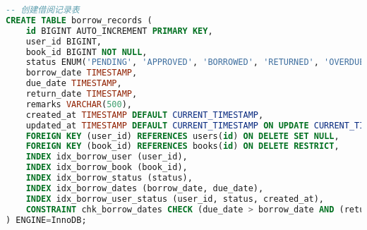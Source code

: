 \documentclass[12pt,a4paper]{article}
\begin{document}
\begin{lstlisting}[language=sql]
-- 创建借阅记录表
CREATE TABLE borrow_records (
    id BIGINT AUTO_INCREMENT PRIMARY KEY,
    user_id BIGINT,
    book_id BIGINT NOT NULL,
    status ENUM('PENDING', 'APPROVED', 'BORROWED', 'RETURNED', 'OVERDUE', 'REJECTED') NOT NULL,
    borrow_date TIMESTAMP,
    due_date TIMESTAMP,
    return_date TIMESTAMP,
    remarks VARCHAR(500),
    created_at TIMESTAMP DEFAULT CURRENT_TIMESTAMP,
    updated_at TIMESTAMP DEFAULT CURRENT_TIMESTAMP ON UPDATE CURRENT_TIMESTAMP,
    FOREIGN KEY (user_id) REFERENCES users(id) ON DELETE SET NULL,
    FOREIGN KEY (book_id) REFERENCES books(id) ON DELETE RESTRICT,
    INDEX idx_borrow_user (user_id),
    INDEX idx_borrow_book (book_id),
    INDEX idx_borrow_status (status),
    INDEX idx_borrow_dates (borrow_date, due_date),
    INDEX idx_borrow_user_status (user_id, status, created_at),
    CONSTRAINT chk_borrow_dates CHECK (due_date > borrow_date AND (return_date IS NULL OR return_date >= borrow_date))
) ENGINE=InnoDB;
\end{lstlisting}
\end{document}
